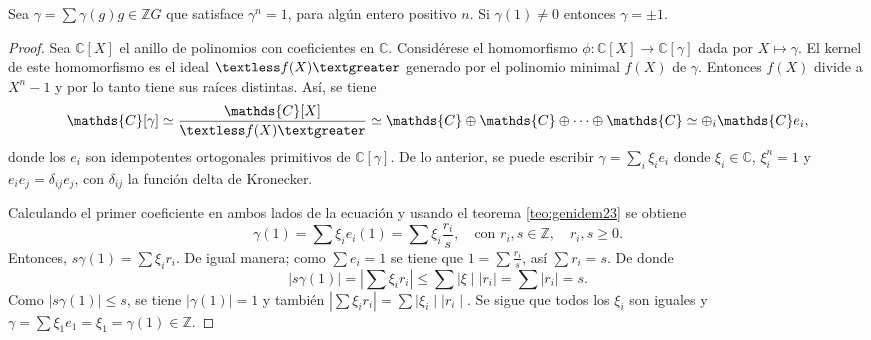 \begin{teorema}\label{teo:Passman-Bass}
Sea $\gamma = \sum\gamma(g)g \in \mathds{Z}G$ que satisface $\gamma^n = 1$, para algún entero positivo $n$. Si $\gamma(1) \neq 0$ entonces $\gamma = \pm 1$.
\end{teorema} 

\begin{proof}
Sea $\mathds{C}[X]$ el anillo de polinomios con coeficientes en $\mathds{C}$. Considérese el homomorfismo $\phi \colon \mathds{C}[X] \to \mathds{C}[\gamma]$ dada por $X \mapsto \gamma$. El kernel de este homomorfismo es el ideal $\textless f(X) \textgreater$ generado por el polinomio minimal $f(X)$ de $\gamma$. Entonces $f(X)$ divide a $X^n - 1$ y por lo tanto tiene sus raíces distintas. 
Así, se tiene 
\begin{equation*}
\mathds{C}[\gamma] \simeq \frac{\mathds{C}[X]}{\textless f(X) \textgreater} \simeq \mathds{C}\oplus\mathds{C}\oplus\cdots\oplus\mathds{C} \simeq \oplus_i\mathds{C}e_i,
\end{equation*}
donde los $e_i$ son idempotentes ortogonales primitivos de $\mathds{C}[\gamma]$. De lo anterior, se puede escribir $\gamma = \sum_{i}\xi_ie_i$ donde $\xi_i\in \mathds{C}$, $\xi_i^n = 1$ y $e_ie_j = \delta_{ij}e_j$, con $\delta_{ij}$ la función delta de Kronecker. 

Calculando el primer coeficiente en ambos lados de la ecuación y usando el teorema \ref{teo:genidem23} se obtiene
\begin{equation*}
\gamma(1) = \sum\xi_ie_i(1) = \sum\xi_i\frac{r_i}{s}, \quad \mbox{con } r_i, s \in \mathds{Z}, \quad r_i,s \geq 0.
\end{equation*}
Entonces, $s\gamma(1) = \sum\xi_ir_i$. De igual manera; como $\sum e_i = 1$ se tiene que $1 = \sum \frac{r_i}{s}$, así $\sum r_i = s$. De donde
\begin{equation*}
\mid s\gamma(1) \mid = \left| \sum\xi_ir_i  \right| \leq \sum \mid \xi \mid \mid r_i \mid = \sum \mid r_i \mid = s.
\end{equation*}
Como $\mid s\gamma(1) \mid \leq s$, se tiene $\mid \gamma(1) \mid = 1$ y también $\left| \sum \xi_ir_i \right| = \sum \mid \xi_i \mid \mid r_i \mid$. Se sigue que todos los $\xi_i$ son iguales y $\gamma = \sum \xi_1e_1 = \xi_1 = \gamma(1) \in \mathds{Z}$. 
\end{proof}

